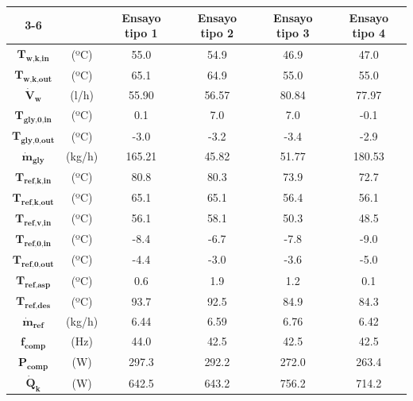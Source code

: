 \documentclass[../main.tex]{subfiles}
\begin{document}
\begin{table}[ht]
\centering
\begin{tabular}{cc|c|c|c|c|}
\cline{3-6}
 & & \textbf{Ensayo tipo 1} & \textbf{Ensayo tipo 2} & \textbf{Ensayo tipo 3} & \textbf{Ensayo tipo 4} \\
\hline
\multicolumn{1}{|c}{$\textbf{T}_\textbf{w,k,in}$} & (ºC) & 55.0 & 54.9 & 46.9 & 47.0 \\
\hline
\multicolumn{1}{|c}{$\textbf{T}_\textbf{w,k,out}$} & (ºC) & 65.1 & 64.9 & 55.0 & 55.0 \\
\hline
\multicolumn{1}{|c}{$\dot{\textbf{V}}_\textbf{w}$} & (l/h) & 55.90 & 56.57 & 80.84 & 77.97 \\
\hline
\multicolumn{1}{|c}{$\textbf{T}_\textbf{gly,0,in}$} & (ºC) & 0.1 & 7.0 & 7.0 & -0.1 \\
\hline
\multicolumn{1}{|c}{$\textbf{T}_\textbf{gly,0,out}$} & (ºC) & -3.0 & -3.2 & -3.4 & -2.9 \\
\hline
\multicolumn{1}{|c}{$\dot{\textbf{m}}_\textbf{gly}$} & (kg/h) & 165.21 & 45.82 & 51.77 & 180.53 \\
\hline
\multicolumn{1}{|c}{$\textbf{T}_\textbf{ref,k,in}$} & (ºC) & 80.8 & 80.3 & 73.9 & 72.7 \\
\hline
\multicolumn{1}{|c}{$\textbf{T}_\textbf{ref,k,out}$} & (ºC) & 65.1 & 65.1 & 56.4 & 56.1 \\
\hline
\multicolumn{1}{|c}{$\textbf{T}_\textbf{ref,v,in}$} & (ºC) & 56.1 & 58.1 & 50.3 & 48.5 \\
\hline
\multicolumn{1}{|c}{$\textbf{T}_\textbf{ref,0,in}$} & (ºC) & -8.4 & -6.7 & -7.8 & -9.0 \\
\hline
\multicolumn{1}{|c}{$\textbf{T}_\textbf{ref,0,out}$} & (ºC) & -4.4 & -3.0 & -3.6 & -5.0 \\
\hline
\multicolumn{1}{|c}{$\textbf{T}_\textbf{ref,asp}$} & (ºC) & 0.6 & 1.9 & 1.2 & 0.1 \\
\hline
\multicolumn{1}{|c}{$\textbf{T}_\textbf{ref,des}$} & (ºC) & 93.7 & 92.5 & 84.9 & 84.3 \\
\hline
\multicolumn{1}{|c}{$\dot{\textbf{m}}_\textbf{ref}$} & (kg/h) & 6.44 & 6.59 & 6.76 & 6.42 \\
\hline
\multicolumn{1}{|c}{$\textbf{f}_\textbf{comp}$} & (Hz) & 44.0 & 42.5 & 42.5 & 42.5 \\
\hline
\multicolumn{1}{|c}{$\textbf{P}_\textbf{comp}$} & (W) & 297.3 & 292.2 & 272.0 & 263.4 \\
\hline
\multicolumn{1}{|c}{$\dot{\textbf{Q}}_\textbf{k}$} & (W) & 642.5 & 643.2 & 756.2 & 714.2 \\

\end{tabular}
\end{table}
\end{document}
